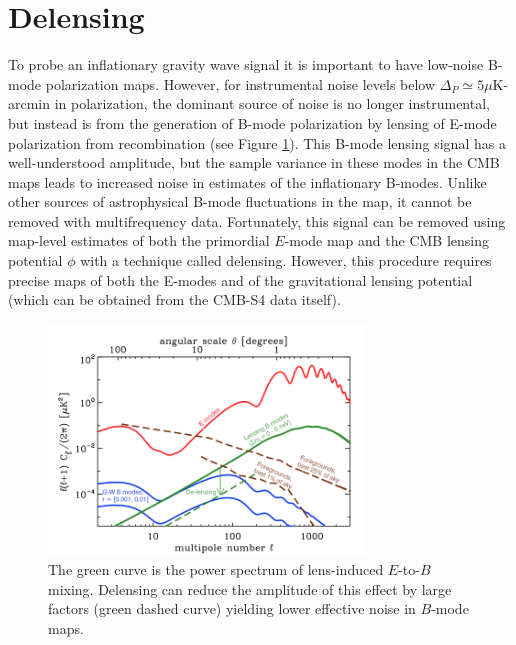 


\section{Delensing}\label{delens}

To probe an inflationary gravity wave signal it is important to have low-noise B-mode polarization maps. However, for instrumental noise levels below $\Delta_P \simeq 5 \mu$K-arcmin in polarization, the dominant source of noise is no longer instrumental, but instead is from the generation of B-mode polarization
by lensing of E-mode polarization from recombination (see Figure \ref{snowmssDelens}).  This B-mode lensing signal has a well-understood amplitude, but the 
sample variance in these modes in the CMB maps leads to 
increased noise in estimates of the inflationary B-modes. Unlike other sources of astrophysical B-mode fluctuations in the map, it cannot be removed with multifrequency data.  Fortunately, this signal can be removed using map-level 
estimates of both the primordial $E$-mode map and the CMB lensing potential $\phi$ with a technique called delensing. However, this procedure requires
precise maps of both the E-modes and of the gravitational lensing potential
(which can be obtained from the CMB-S4 data itself).

\begin{figure}[htbp]
\centering
\includegraphics[width=0.75\textwidth]{CMBLensing/Delensing.png}
\caption{The green curve is the power spectrum of lens-induced $E$-to-$B$ mixing.  Delensing can reduce the amplitude of this effect by large factors (green dashed curve) yielding lower effective noise in $B$-mode maps.}
\label{snowmssDelens}
\end{figure}

